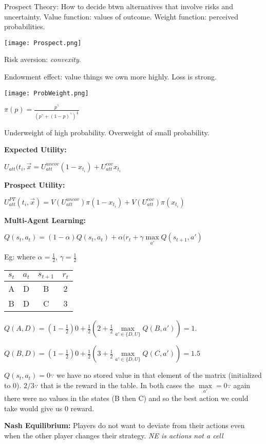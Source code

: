 \documentclass[10pt,letter]{article}
\begin{document}
\begin{multicols}{2}
Prospect Theory: How to decide btwn alternatives that involve risks and uncertainty.
Value function: values of outcome. Weight function: perceived probabilities.

\texttt{[image: Prospect.png]}

Risk aversion: \textit{convexity}. 

Endowment effect: value things we own more highly. Loss is strong.

\texttt{[image: ProbWeight.png]}

$\pi(p) = \frac{p^\gamma}{(p^\gamma + (1-p)^\gamma)^\frac{1}{\gamma}}$

Underweight of high probability. Overweight of small probability.

\textbf{Expected Utility:}

$U_{att}(t_i,\vec{x} = U_{att}^{uncov} (1-x_{t_i}) + U_{att}^{cov} x_{t_i}$

\textbf{Prospect Utility:}

$U_{att}^{PT} (t_i,\vec{x}) = V(U_{att}^{uncov}) \pi(1-x_{t_i}) + V(U_{att}^{cov}) \pi(x_{t_i})$

\textbf{Multi-Agent Learning:}

$Q(s_t,a_t) = (1-\alpha)Q(s_t,a_t) + \alpha(r_t + \gamma\max\limits_{a'}Q(s_{t+1},a')$

Eg: where $\alpha=\frac12$, $\gamma=\frac12$

\begin{tabular}{|c|c|c|c|}
    \hline
    $s_t$ & $a_t$ & $s_{t+1}$ & $r_t$ \\\hline
    A & D & B & 2\\\hline
    B & D & C & 3\\\hline
\end{tabular}

$Q(A,D) = (1-\frac12)0 + \frac12(2 + \frac12\max\limits_{a'\in\{D,U\}}Q(B,a'))=1.$

$Q(B,D) = (1-\frac12)0 + \frac12(3 + \frac12\max\limits_{a'\in\{D,U\}}Q(C,a'))=1.5$

$Q(s_t,a_t)=0\because$ we have no stored value in that element of the matrix
(initialized to 0). $2/3\because$ that is the reward in the table. In both
cases the $\max\limits_{a'}=0\because$ again there were no values in the states
(B then C) and so the best action we could take would give us $0$ reward. 

\textbf{Nash Equilibrium:} Players do not want to deviate from their actions even
when the other player changes their strategy. \textit{NE is actions not a cell}


\end{multicols}
\end{document}

